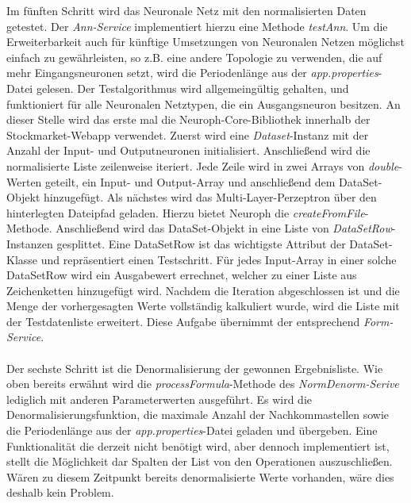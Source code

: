 Im fünften Schritt wird das Neuronale Netz mit den normalisierten Daten getestet. Der \emph{Ann-Service} implementiert hierzu eine Methode \emph{testAnn}. Um die Erweiterbarkeit auch für künftige Umsetzungen von Neuronalen Netzen möglichst einfach zu gewährleisten, so z.B. eine andere Topologie zu verwenden, die auf mehr Eingangsneuronen setzt, wird die Periodenlänge aus der \emph{app.properties}-Datei gelesen. Der Testalgorithmus wird allgemeingültig gehalten, und funktioniert für alle Neuronalen Netztypen, die ein Ausgangsneuron besitzen. 
An dieser Stelle wird das erste mal die Neuroph-Core-Bibliothek innerhalb der Stockmarket-Webapp verwendet. 
Zuerst wird eine \emph{Dataset}-Instanz mit der Anzahl der Input- und Outputneuronen initialisiert.
Anschließend wird die normalisierte Liste zeilenweise iteriert. Jede Zeile wird in zwei Arrays von \emph{double}-Werten geteilt, ein Input- und Output-Array und anschließend dem DataSet-Objekt hinzugefügt.
Als nächstes wird das Multi-Layer-Perzeptron über den hinterlegten Dateipfad geladen. Hierzu bietet Neuroph die \emph{createFromFile}-Methode.
Anschließend wird das DataSet-Objekt in eine Liste von \emph{DataSetRow}-Instanzen gesplittet. Eine DataSetRow ist das wichtigste Attribut der DataSet-Klasse und repräsentiert einen Testschritt. Für jedes Input-Array in einer solche DataSetRow wird ein Ausgabewert errechnet, welcher zu einer Liste aus Zeichenketten hinzugefügt wird.
Nachdem die Iteration abgeschlossen ist und die Menge der vorhergesagten Werte vollständig kalkuliert wurde, wird die Liste mit der Testdatenliste erweitert. Diese Aufgabe übernimmt der entsprechend \emph{Form-Service}.\\\\

Der sechste Schritt ist die Denormalisierung der gewonnen Ergebnisliste. Wie oben bereits erwähnt wird die \emph{processFormula}-Methode des \emph{NormDenorm-Serive} lediglich mit anderen Parameterwerten ausgeführt. Es wird die Denormalisierungsfunktion, die maximale Anzahl der Nachkommastellen sowie die Periodenlänge aus der \emph{app.properties}-Datei geladen und übergeben. Eine Funktionalität die derzeit nicht benötigt wird, aber dennoch implementiert ist, stellt die Möglichkeit dar Spalten der List von den Operationen auszuschließen. Wären zu diesem Zeitpunkt bereits denormalisierte Werte vorhanden, wäre dies deshalb kein Problem.

